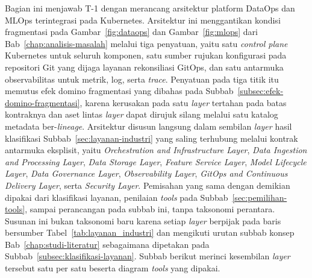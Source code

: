 Bagian ini menjawab T-1 dengan merancang arsitektur platform DataOps dan MLOps terintegrasi pada Kubernetes. Arsitektur ini menggantikan kondisi fragmentasi pada Gambar~\ref{fig:dataops} dan Gambar~\ref{fig:mlops} dari Bab~\ref{chap:analisis-masalah} melalui tiga penyatuan, yaitu satu \textit{control plane} Kubernetes untuk seluruh komponen, satu sumber rujukan konfigurasi pada repositori Git yang dijaga layanan rekonsiliasi GitOps, dan satu antarmuka observabilitas untuk metrik, log, serta \textit{trace}. Penyatuan pada tiga titik itu memutus efek domino fragmentasi yang dibahas pada Subbab~\ref{subsec:efek-domino-fragmentasi}, karena kerusakan pada satu \textit{layer} tertahan pada batas kontraknya dan aset lintas \textit{layer} dapat dirujuk silang melalui satu katalog metadata ber-\textit{lineage}. Arsitektur disusun langsung dalam sembilan \textit{layer} hasil klasifikasi Subbab~\ref{sec:layanan-industri} yang saling terhubung melalui kontrak antarmuka eksplisit, yaitu \textit{Orchestration and Infrastructure Layer}, \textit{Data Ingestion and Processing Layer}, \textit{Data Storage Layer}, \textit{Feature Service Layer}, \textit{Model Lifecycle Layer}, \textit{Data Governance Layer}, \textit{Observability Layer}, \textit{GitOps and Continuous Delivery Layer}, serta \textit{Security Layer}. Pemisahan yang sama dengan demikian dipakai dari klasifikasi layanan, penilaian \textit{tools} pada Subbab~\ref{sec:pemilihan-tools}, sampai perancangan pada subbab ini, tanpa taksonomi perantara. Susunan ini bukan taksonomi baru karena setiap \textit{layer} berpijak pada baris bersumber Tabel~\ref{tab:layanan_industri} dan mengikuti urutan subbab konsep Bab~\ref{chap:studi-literatur} sebagaimana dipetakan pada Subbab~\ref{subsec:klasifikasi-layanan}. Subbab berikut merinci kesembilan \textit{layer} tersebut satu per satu beserta diagram \textit{tools} yang dipakai.

